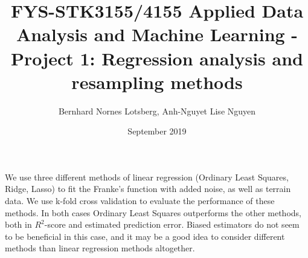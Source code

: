 \documentclass[a4paper, 10pt]{article}
\title{FYS-STK3155/4155 Applied Data Analysis and Machine Learning - Project 1: Regression analysis and resampling methods }
\author{Bernhard Nornes Lotsberg, Anh-Nguyet Lise Nguyen}
\date{September 2019}
\renewenvironment{abstract}
 {\small
  \begin{center}
  \bfseries \abstractname\vspace{-.5em}\vspace{0pt}
  \end{center}
  \list{}{%
    \setlength{\leftmargin}{2.5 cm}%
    \setlength{\rightmargin}{\leftmargin}%
  }%
  \item\relax}
 {\endlist}
\begin{document}
\maketitle


\begin{abstract} \noindent
    We use three different methods of linear regression (Ordinary Least Squares, Ridge, Lasso) to fit the Franke's function with added noise, as well as terrain data. We use k-fold cross validation to evaluate the performance of these methods. In both cases Ordinary Least Squares outperforms the other methods, both in $R^2$-score and estimated prediction error. Biased estimators do not seem to be beneficial in this case, and it may be a good idea to consider different methods than linear regression methods altogether.
\end{abstract}
\end{document}
